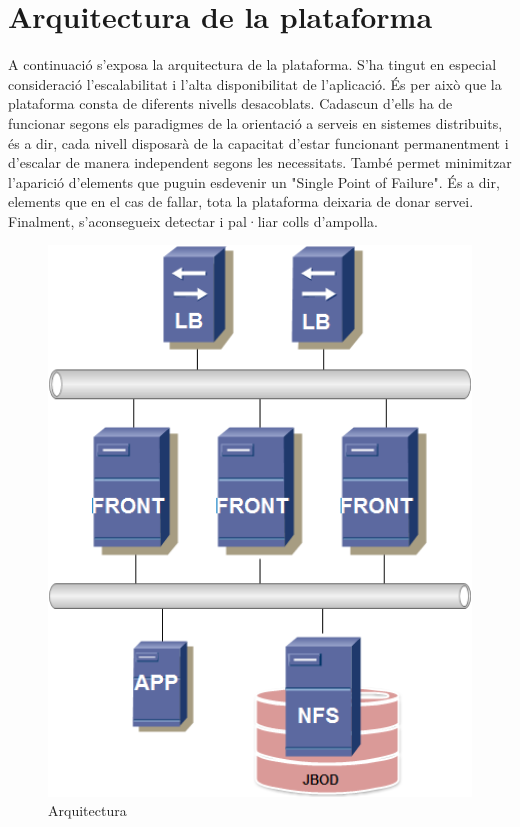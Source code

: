 \documentclass[a4paper, 11pt]{article}
\begin{document}
\section{Arquitectura de la plataforma}

A continuació s'exposa la arquitectura de la plataforma. S'ha tingut en especial consideració l'escalabilitat i l'alta disponibilitat de l'aplicació. És per això que la plataforma consta de diferents nivells desacoblats. Cadascun d'ells ha de funcionar segons els paradigmes de la orientació a serveis en sistemes distribuits, és a dir, cada nivell disposarà de la capacitat d'estar funcionant permanentment i d'escalar de manera independent segons les necessitats. 
També permet minimitzar l'aparició d'elements que puguin esdevenir un "Single Point of Failure". És a dir, elements que en el cas de fallar, tota la plataforma deixaria de donar servei. Finalment, s’aconsegueix detectar i pal·liar colls d'ampolla.

\begin{figure}[H]
    \centering
    \includegraphics[width=1.0\textwidth]{IM}
    \caption{Arquitectura \label{fig:centralized}}    
\end{figure}
\end{document}
